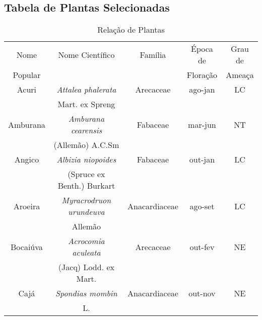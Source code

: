 
\begin{anexosenv}
\partanexos

\chapter{Tabela de Plantas Selecionadas}     %
\label{chap:anexoA}

\begin{table}[h]
	
	\caption{Relação de Plantas}
	\begin{tabular}{ccccc}
		\hline
		Nome		  	 & Nome Científico 				   			& Família 		& Época de 			 & Grau de			\\
		Popular			 & 											&				& Floração			& Ameaça			\\
		\hline                               %
		Acuri   		 & \textit{Attalea phalerata}	   			& Arecaceae 	& ago-jan 			& LC				\\
		& Mart. ex Spreng				   			&				&				    &					\\
		
		Amburana		 & \textit{Amburana cearensis} 	   			& Fabaceae 		& mar-jun 			& NT				\\
		& (Allemão) A.C.Sm				   			&				&				    &					\\
		
		Angico 			 & \textit{Albizia niopoides} 	   			& Fabaceae 		& out-jan 			& LC 				\\
		& (Spruce ex Benth.) Burkart 	   			&				&					&					\\
		
		Aroeira 		 & \textit{Myracrodruon urundeuva} 			& Anacardiaceae	& ago-set 			& LC 				\\
		&  Allemão									&				&				    &					\\
		
		Bocaiúva 		 & \textit{Acrocomia aculeata}      		& Arecaceae 	& out-fev 			& NE 				\\
		&  (Jacq) Lodd. ex Mart.		    		&				&				    &					\\
		
		Cajá 			 & \textit{Spondias mombin}		    		& Anacardiaceae & out-nov 			& NE 				\\
		& L. 						  	    		&				&				    &					\\
		

\end{tabular}
\end{table}
\end{anexosenv}

